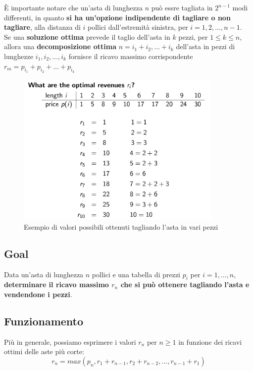 È importante notare che un'asta di lunghezza $n$ può essre tagliata in
$2^{n-1}$ modi differenti, in quanto \textbf{si ha un'opzione
  indipendente di tagliare o non tagliare}, alla distanza di $i$ pollici
dall'estremità sinistra, per $i = 1, 2, \ldots, n-1$.\\

Se una \textbf{soluzione ottima} prevede il taglio dell'asta in $k$
pezzi, per $1 \le k \le n$, allora una \textbf{decomposizione ottima}
$n = i_1 + i_2, \ldots + i_k$ dell'asta in pezzi di lunghezze
$i_1, i_2, \ldots, i_k$ fornisce il ricavo massimo corrispondente
$r_m = p_{i_1} + p_{i_2} + \ldots + p_{i_k}$

\begin{figure}[H]
  \centering
  \includegraphics[width=10cm, keepaspectratio]{capitoli/programmazione_dinamica/imgs/pole3.png}
  \caption{Esempio di valori possibili ottenuti tagliando l'asta in vari pezzi}

\end{figure}

\subsection{Goal}

Data un'asta di lunghezza $n$ pollici e una tabella di prezzi $p_i$
per $i = 1, \ldots, n$, \textbf{determinare il ricavo massimo $r_n$ che
  si può ottenere tagliando l'asta e vendendone i pezzi}.

\subsection{Funzionamento}

Più in generale, possiamo esprimere i valori $r_n$ per $n \ge 1$ in
funzione dei ricavi ottimi delle aste più corte:
$$
  r_n = max(p_n, r_1 + r_{n-1}, r_2 + r_{n-2}, \ldots, r_{n-1} + r_1)
$$

